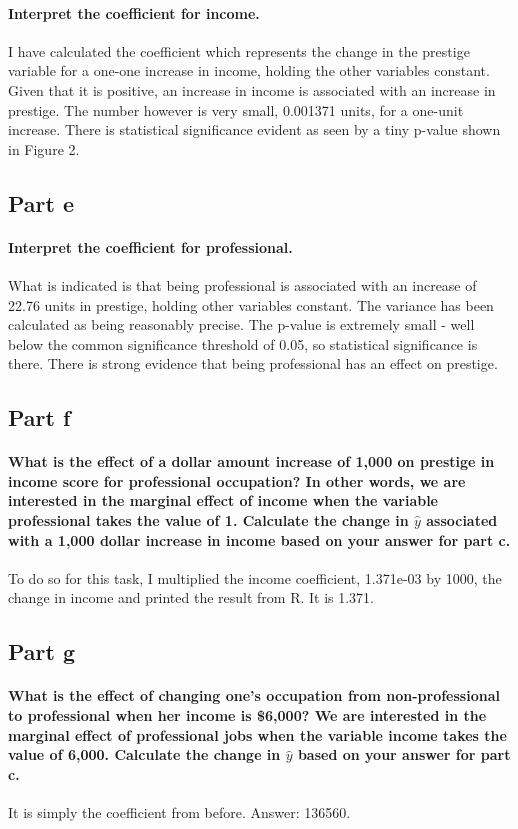 \documentclass{article}
\begin{document}
	\paragraph{Interpret the coefficient for income.}
	I have calculated the coefficient which represents the change in the prestige variable for a one-one increase in income, holding the other variables constant. Given that it is positive, an increase in income is associated with an increase in prestige. The number however is very small, 0.001371 units, for a one-unit increase. There is statistical significance evident as seen by a tiny p-value shown in Figure 2. 
	\subsection{Part e}
	\paragraph{Interpret the coefficient for professional.}
	What is indicated is that being professional is associated with an increase of 22.76 units in prestige, holding other variables constant. The variance has been calculated as being reasonably precise. The p-value is extremely small - well below the common significance threshold of 0.05, so statistical significance is there. There is strong evidence that being professional has an effect on prestige.
	\subsection{Part f}
	\paragraph{What is the effect of a dollar amount increase of 1,000 on prestige in income score for professional occupation? In other words, we are interested in the marginal effect of income when the variable professional takes the value of 1. Calculate the change in $\hat{y}$ associated with a 1,000 dollar increase in income based on your answer for part c.} To do so for this task, I multiplied the income coefficient, 1.371e-03 by 1000, the change in income and printed the result from R. It is 1.371.
	\subsection{Part g}
	\paragraph{What is the effect of changing one's occupation from non-professional to professional when her income is \$6,000? We are interested in the marginal effect of professional jobs when the variable income takes the value of 6,000. Calculate the change in $\hat{y}$ based on your answer for part c.}It is simply the coefficient from before. Answer: 136560. 
\end{document}

